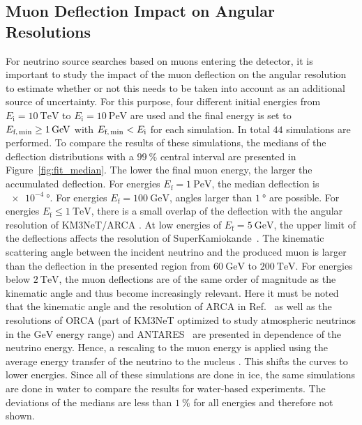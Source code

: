 \subsection{Muon Deflection Impact on Angular Resolutions}
For neutrino source searches based on muons entering the detector, 
it is important to study the impact of the muon 
deflection on the angular resolution to estimate whether or not this needs to be 
taken into account as an additional source of uncertainty.
For this purpose, four different initial energies 
from $E_{\text{i}} = \SI{10}{\tera\electronvolt}$ to 
$E_{\text{i}} = \SI{10}{\peta\electronvolt}$ are used and the final 
energy is set to $E_{\text{f,\,min}} \geq \SI{1}{\giga\electronvolt}$ with 
$E_{\text{f,\,min}} < E_{\text{i}}$ for each simulation. 
In total $\num{44}$ simulations are performed. 
To compare the results of these simulations, the medians of the deflection distributions 
with a $\SI{99}{\percent}$ central interval are presented in 
Figure~\ref{fig:fit_median}.
The lower the final muon energy, the larger the accumulated deflection. 
For energies $E_{\text{f}} = \SI{1}{\peta\electronvolt}$, the median deflection 
is $\SI{e-4}{\degree}$. For energies $E_{\text{f}} = \SI{100}{\giga\electronvolt}$, 
angles larger than $\SI{1}{\degree}$ are possible. 
For energies  
$E_{\text{f}} \leq \SI{1}{\tera\electronvolt}$, 
there is a small overlap of the deflection with the angular resolution of KM3NeT/ARCA 
\cite{KM3NeT_Resolution2021, KM3NeT_Resolution2016}. 
At low energies of $E_{\mathrm{f}} = \SI{5}{\giga\electronvolt}$, the upper limit of the 
deflections affects the resolution of SuperKamiokande~\cite{SuperKamiokande_Resolution2008}. 
The kinematic scattering angle between the incident neutrino and the produced muon is 
larger than the deflection in the presented region from $\SI{60}{\giga\electronvolt}$
to $\SI{200}{\tera\electronvolt}$. For energies below $\SI{2}{\tera\electronvolt}$,  
the muon deflections are of the same order of magnitude as the kinematic angle and thus become increasingly relevant.
Here it must be noted that the kinematic angle 
and the resolution of ARCA in Ref.~\cite{KM3NeT_Resolution2021} as well as 
the resolutions of ORCA (part of KM3NeT optimized to study atmospheric neutrinos in the $\si{\giga\electronvolt}$ energy range) \cite{ORCA_Resolution2021} and ANTARES~\cite{ANTARES_Resolution2019} are presented in dependence of the neutrino energy. 
Hence, a rescaling to the muon energy is applied using the average energy transfer of the neutrino to 
the nucleus \cite{GANDHI199681}. This shifts the curves to lower energies. 
Since all of these simulations are done 
in ice, the same simulations are done in water to compare the results for 
water-based experiments. The deviations of the medians
are less than $\SI{1}{\percent}$ for all energies and therefore not shown.

